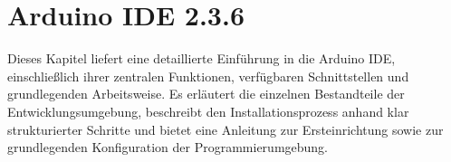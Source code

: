 % 
% 
% 


\chapter{Arduino IDE 2.3.6}
Dieses Kapitel liefert eine detaillierte Einführung in die Arduino IDE, einschlie\ss lich ihrer zentralen Funktionen, verfügbaren Schnittstellen und grundlegenden Arbeitsweise. Es erläutert die einzelnen Bestandteile der Entwicklungsumgebung, beschreibt den Installationsprozess anhand klar strukturierter Schritte und bietet eine Anleitung zur Ersteinrichtung sowie zur grundlegenden Konfiguration der Programmierumgebung. 

